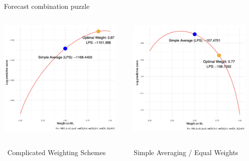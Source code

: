 \begin{frame}{Forecast combination puzzle}

\begin{columns}[t]
    \begin{column}{0.5\textwidth}
        \centering
        \includegraphics[width=6cm]{Graph/Ex1.png}
    \end{column}
    
    \begin{column}{0.5\textwidth}
        \centering
        \includegraphics[width=6cm]{Graph/Ex2.png}
    \end{column}
    \end{columns}

    \vspace{-6mm}
    
    \begin{columns}[t]
    \begin{column}{0.5\textwidth}
        \begin{alertblock}{}
        \centering
         \ Complicated Weighting Schemes
        \end{alertblock}
    \end{column}
    
    \begin{column}{0.5\textwidth}
        \begin{exampleblock}{}
        \centering
         \ Simple Averaging
        / Equal Weights
        \end{exampleblock}
    \end{column}
    \end{columns}

\end{frame}



